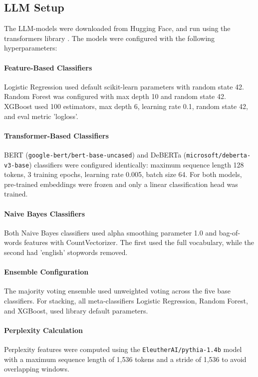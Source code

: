 \documentclass[11pt]{article}
\begin{document}
\subsection{LLM Setup}
The LLM-models were downloaded from Hugging Face, and run using the transformers library \citep{wolf-etal-2020-transformers}. 
The models were configured with the following hyperparameters:

\paragraph{Feature-Based Classifiers}
Logistic Regression used default scikit-learn parameters with random state 42. Random Forest was configured with max depth 10 and random state 42. XGBoost used 100 estimators, max depth 6, learning rate 0.1, random state 42, and eval metric 'logloss'.

\paragraph{Transformer-Based Classifiers}
BERT (\texttt{google-bert/bert-base-uncased}) and DeBERTa (\texttt{microsoft/deberta-v3-base}) classifiers were configured identically: maximum sequence length 128 tokens, 3 training epochs, learning rate 0.005, batch size 64. For both models, pre-trained embeddings were frozen and only a linear classification head was trained.

\paragraph{Naive Bayes Classifiers}
Both Naive Bayes classifiers used alpha smoothing parameter 1.0 and bag-of-words features with CountVectorizer. The first used the full vocabulary, while the second had 'english' stopwords removed.

\paragraph{Ensemble Configuration}
The majority voting ensemble used unweighted voting across the five base classifiers. For stacking, all meta-classifiers Logistic Regression, Random Forest, and XGBoost, used library default parameters.

\paragraph{Perplexity Calculation}
Perplexity features were computed using the \texttt{EleutherAI/pythia-1.4b} model with a maximum sequence length of 1,536 tokens and a stride of 1,536 to avoid overlapping windows.
\end{document}
